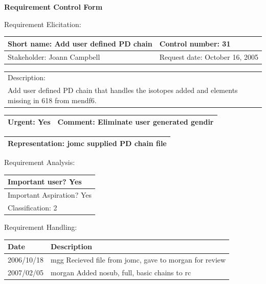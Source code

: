 \begin{center}\Large\bf
Requirement Control Form
\end{center}
\vspace{24pt}

Requirement Elicitation:

\begin{tabular}{|p{211pt}|p{211pt}|} \hline
Short name: Add user defined PD chain & Control number: 31\\ \hline
Stakeholder: Joann Campbell & Request date: October 16, 2005\\
\end{tabular}
\begin{tabular}{|p{433pt}|} \hline
Description: \\ 
Add user defined PD chain that handles the isotopes
added and elements missing in 618 from mendf6.\\
\hline
\end{tabular} 
\begin{tabular}{|p{211pt}|p{211pt}|} \hline
Urgent: Yes & Comment: Eliminate user generated gendir\\ \hline
\end{tabular}

\vspace{12pt}

\begin{tabular}{|p{433pt}|} \hline
Representation: jomc supplied PD chain file \\ \hline
\end{tabular}
\vspace{24pt}

Requirement Analysis:

\begin{tabular}{|p{433pt}|} \hline
Important user? Yes \\ \hline
Important Aspiration? Yes \\ \hline
Classification: 2 \\ \hline
\end{tabular}
\vspace{24pt}

Requirement Handling:

\begin{tabular}{|p{72pt}|p{351pt}|} \hline
Date & Description \\ \hline
2006/10/18 & mgg Recieved file from jomc, gave to morgan for review\\
\hline
2007/02/05 & morgan Added nosub, full, basic chains to rc\\ \hline
\end{tabular}
